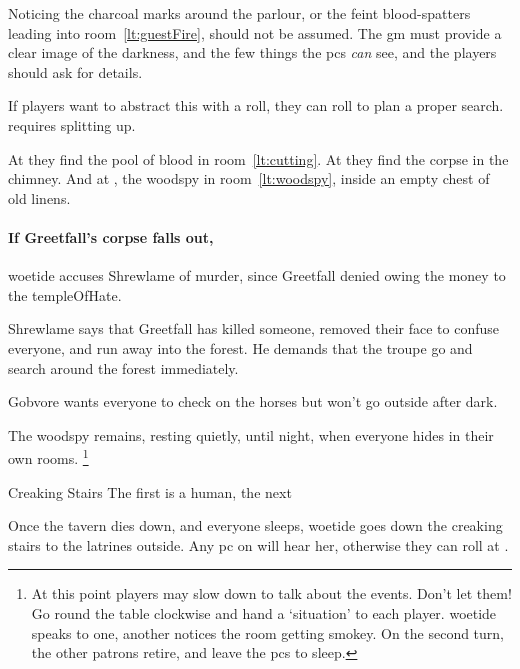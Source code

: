 \documentclass[10pt,twoside]{book}
\begin{document}
Noticing the charcoal marks around the parlour, or the feint blood-spatters leading into room~\vref{lt:guestFire}, should not be assumed.
The \gls{gm} must provide a clear image of the darkness, and the few things the \glspl{pc} \emph{can} see, and the players should ask for details.

If players want to abstract this with a roll, they can roll  to plan a proper search.
 requires splitting up.

\woetide

At \tn[6] they find the pool of blood in room~\vref{lt:cutting}.
At \tn[10] they find the corpse in the chimney.
And at \tn[12], the \gls{woodspy} in room~\vref{lt:woodspy}, inside an empty chest of old linens.

\paragraph{If Greetfall's corpse falls out,}
\Gls{woetide} accuses Shrewlame of murder, since Greetfall denied owing the money to the \gls{templeOfHate}.

Shrewlame says that Greetfall has killed someone, removed their face to confuse everyone, and run away into the forest.
He demands that the troupe go and search around the forest immediately.

Gobvore wants everyone to check on the horses but won't go outside after dark.


The \gls{woodspy} remains, resting quietly, until night, when everyone hides in their own rooms.%
\footnote{At this point players may slow down to talk about the events.  Don't let them!  Go round the table clockwise and hand a `situation' to each player.  \Gls{woetide} speaks to one, another notices the room getting smokey.  On the second turn, the other patrons retire, and leave the \glspl{pc} to sleep.}

{Creaking Stairs}%
{The first is a human, the next }%

Once the tavern dies down, and everyone sleeps, \gls{woetide} goes down the creaking stairs to the latrines outside.
Any \gls{pc} on  will hear her, otherwise they can roll  at \tn[12].
\end{document}
